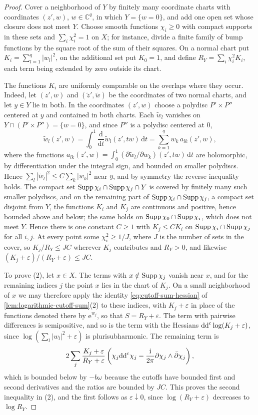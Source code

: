 \begin{proof}
Cover a neighborhood of $Y$ by finitely many coordinate charts with coordinates $(z',w)$, $w\in\mathbb C^q$, in which $Y=\{w=0\}$, and add one open set whose closure does not meet $Y$. Choose smooth functions $\chi_i\geq0$ with compact supports in these sets and $\sum_i\chi_i^2=1$ on $X$; for instance, divide a finite family of bump functions by the square root of the sum of their squares. On a normal chart put $K_i=\sum_{l=1}^q|w_l|^2$, on the additional set put $K_0=1$, and define $R_Y=\sum_i\chi_i^2K_i$, each term being extended by zero outside its chart.

The functions $K_i$ are uniformly comparable on the overlaps where they occur. Indeed, let $(z',w)$ and $(\tilde z',\tilde w)$ be the coordinates of two normal charts, and let $y\in Y$ lie in both. In the coordinates $(z',w)$ choose a polydisc $P'\times P''$ centered at $y$ and contained in both charts. Each $\tilde w_l$ vanishes on $Y\cap(P'\times P'')=\{w=0\}$, and since $P''$ is a polydisc centered at $0$,
\[
 \tilde w_l(z',w)=\int_0^1\frac{\mathrm d}{\mathrm dt}\tilde w_l(z',tw)\,\mathrm dt=\sum_{k=1}^qw_k\,a_{lk}(z',w),
\]
where the functions $a_{lk}(z',w)=\int_0^1(\partial\tilde w_l/\partial w_k)(z',tw)\,\mathrm dt$ are holomorphic, by differentiation under the integral sign, and bounded on smaller polydiscs. Hence $\sum_l|\tilde w_l|^2\leq C\sum_k|w_k|^2$ near $y$, and by symmetry the reverse inequality holds. The compact set $\operatorname{Supp}\chi_i\cap\operatorname{Supp}\chi_j\cap Y$ is covered by finitely many such smaller polydiscs, and on the remaining part of $\operatorname{Supp}\chi_i\cap\operatorname{Supp}\chi_j$, a compact set disjoint from $Y$, the functions $K_i$ and $K_j$ are continuous and positive, hence bounded above and below; the same holds on $\operatorname{Supp}\chi_0\cap\operatorname{Supp}\chi_i$, which does not meet $Y$. Hence there is one constant $C\geq1$ with $K_j\leq CK_i$ on $\operatorname{Supp}\chi_i\cap\operatorname{Supp}\chi_j$ for all $i,j$. At every point some $\chi_i^2\geq1/J$, where $J$ is the number of sets in the cover, so $K_j/R_Y\leq JC$ wherever $K_j$ contributes and $R_Y>0$, and likewise $(K_j+\varepsilon)/(R_Y+\varepsilon)\leq JC$.

To prove (2), let $x\in X$. The terms with $x\notin\operatorname{Supp}\chi_j$ vanish near $x$, and for the remaining indices $j$ the point $x$ lies in the chart of $K_j$. On a small neighborhood of $x$ we may therefore apply the identity \eqref{eq:cutoff-sum-hessian} of \cref{lem:logarithmic-cutoff-sum}(2) to these indices, with $K_j+\varepsilon$ in place of the functions denoted there by $\mathrm e^{w_j}$, so that $S=R_Y+\varepsilon$. The term with pairwise differences is semipositive, and so is the term with the Hessians $\mathrm{dd}^{\mathrm{c}}\log(K_j+\varepsilon)$, since $\log(\sum_l|w_l|^2+\varepsilon)$ is plurisubharmonic. The remaining term is
\[
 2\sum_j\frac{K_j+\varepsilon}{R_Y+\varepsilon}
       \left(\chi_j\mathrm{dd}^{\mathrm{c}}\chi_j-
                   \frac{\mathrm i}{2\pi}\partial\chi_j\wedge\bar\partial\chi_j\right),
\]
which is bounded below by $-b\omega$ because the cutoffs have bounded first and second derivatives and the ratios are bounded by $JC$. This proves the second inequality in (2), and the first follows as $\varepsilon\downarrow0$, since $\log(R_Y+\varepsilon)$ decreases to $\log R_Y$.


\end{proof}
